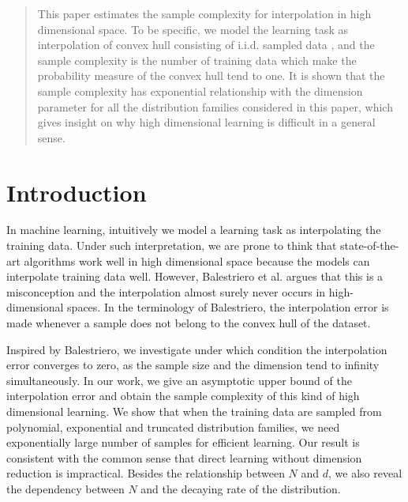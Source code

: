 \documentclass[conference,a4paper]{IEEEtran}
\begin{document}
\maketitle

\begin{abstract}
  This paper estimates the sample complexity for interpolation in high dimensional space.
  To be specific, we model the learning task as interpolation of convex hull consisting of i.i.d. sampled data
  , and the sample complexity is the number of training data which make the probability measure of the convex hull
  tend to one. It is shown that the sample complexity has exponential relationship with the dimension parameter for all the distribution families
  considered in this paper, which gives insight on why high dimensional learning is difficult in a general sense. 
\end{abstract}


\section{Introduction}
\label{sec:intro}
In machine learning, intuitively we model a learning task as interpolating the
training data. Under such interpretation, we are prone to think that state-of-the-art
algorithms work well in high dimensional space because the models can interpolate training data well. 
However, Balestriero et al. \cite{balestriero2021learning}
argues that this is a misconception and the interpolation almost surely never occurs in high-dimensional spaces.
In the terminology of Balestriero, the interpolation error is made whenever a sample does not belong to the convex hull of the dataset.

Inspired by Balestriero, we investigate under which condition the interpolation error converges to zero,
as the sample size and the dimension tend to infinity simultaneously. In our work, we give
an asymptotic upper bound of the interpolation error and obtain the sample complexity of this kind of
high dimensional learning. We show that when the training data are sampled from polynomial, exponential and truncated distribution families,
we need exponentially large number of samples for efficient learning. Our result is consistent with the common sense
that direct learning
without dimension reduction is impractical. Besides the relationship between $N$ and $d$,
we also reveal the dependency between $N$ and the decaying rate of the distribution.
\end{document}
